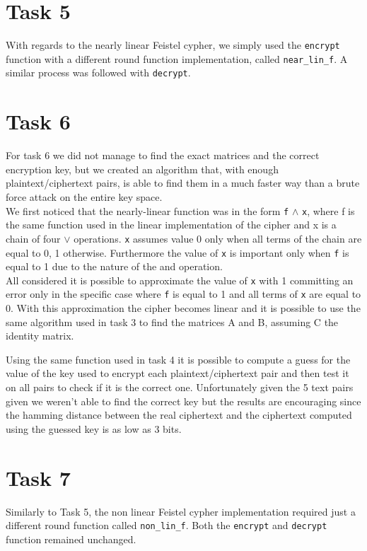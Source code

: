 \documentclass{report}
\begin{document}
\section*{Task 5}
With regards to the nearly linear Feistel cypher, we simply used the {\tt encrypt} function with a different round function implementation, called {\tt near\_lin\_f}. A similar process was followed with {\tt decrypt}.

\section*{Task 6}
For task 6 we did not manage to find the exact matrices and the correct encryption key, but we created an algorithm that, with enough plaintext/ciphertext pairs, is able to find them in a much faster way than a brute force attack on the entire key space.\\
We first noticed that the nearly-linear function was in the form {\tt f} $\wedge $ {\tt  x}, where f is the same function used in the linear implementation of the cipher and x is a chain of four $\lor$ operations.  {\tt  x} assumes value 0 only when all terms of the chain are equal to 0, 1 otherwise. Furthermore the value of {\tt  x} is important only when {\tt f} is equal to 1 due to the nature of the and operation.\\
All considered it is possible to approximate the value of {\tt  x} with 1 committing an error only in the specific case where {\tt f} is equal to 1 and all terms of {\tt  x} are equal to 0. With this approximation the cipher becomes linear and it is possible to use the same algorithm used in task 3 to find the matrices A and B, assuming C the identity matrix.


Using the same function used in task 4 it is possible to compute a guess for the value of the key used to encrypt each plaintext/ciphertext pair and then test it on all pairs to check if it is the correct one. Unfortunately given the 5 text pairs given we weren't able to find the correct key but the results are encouraging since the hamming distance between the real ciphertext and the ciphertext computed using the guessed key is as low as 3 bits. 

\section*{Task 7}
Similarly to Task 5, the non linear Feistel cypher implementation required just a different round function called {\tt non\_lin\_f}. Both the {\tt encrypt} and {\tt decrypt} function remained unchanged.
\end{document}
